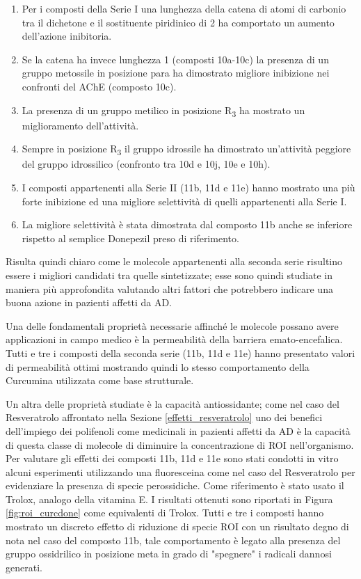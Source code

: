 \documentclass[a4paper, 12pt]{article}
\begin{document}
\begin{enumerate}
	\item Per i composti della Serie I una lunghezza della catena di atomi di carbonio tra il dichetone e il sostituente piridinico di 2 ha comportato un aumento dell'azione inibitoria.
	\item Se la catena ha invece lunghezza 1 (composti 10a-10c) la presenza di un gruppo metossile in posizione para ha dimostrato migliore inibizione nei confronti del AChE (composto 10c).
	\item La presenza di un gruppo metilico in posizione R\textsubscript{3} ha mostrato un miglioramento dell'attività.
	\item Sempre in posizione R\textsubscript{3} il gruppo idrossile ha dimostrato un'attività peggiore del gruppo idrossilico (confronto tra 10d e 10j, 10e e 10h).
	\item I composti appartenenti alla Serie II (11b, 11d e 11e) hanno mostrato una più forte inibizione ed una migliore selettività di quelli appartenenti alla Serie I.
	\item La migliore selettività è stata dimostrata dal composto 11b anche se inferiore rispetto al semplice Donepezil preso di riferimento.
\end{enumerate}

Risulta quindi chiaro come le molecole appartenenti alla seconda serie risultino essere i migliori candidati tra quelle sintetizzate; esse sono quindi studiate in maniera più approfondita valutando altri fattori che potrebbero indicare una buona azione in pazienti affetti da AD.

Una delle fondamentali proprietà necessarie affinché le molecole possano avere applicazioni in campo medico è la permeabilità della barriera emato-encefalica. Tutti e tre i composti della seconda serie (11b, 11d e 11e) hanno presentato valori di permeabilità ottimi mostrando quindi lo stesso comportamento della Curcumina utilizzata come base strutturale.

Un altra delle proprietà studiate è la capacità antiossidante; come nel caso del Resveratrolo affrontato nella Sezione \ref{effetti_resveratrolo} uno dei benefici dell'impiego dei polifenoli come medicinali in pazienti affetti da AD è la capacità di questa classe di molecole di diminuire la concentrazione di ROI nell'organismo. Per valutare gli effetti dei composti 11b, 11d e 11e sono stati condotti in vitro alcuni esperimenti utilizzando una fluoresceina come nel caso del Resveratrolo per evidenziare la presenza di specie perossidiche. Come riferimento è stato usato il Trolox, analogo della vitamina E. I risultati ottenuti sono riportati in Figura \ref{fig:roi_curcdone} come equivalenti di Trolox. Tutti e tre i composti hanno mostrato un discreto effetto di riduzione di specie ROI con un risultato degno di nota nel caso del composto 11b, tale comportamento è legato alla presenza del gruppo ossidrilico in posizione meta in grado di "spegnere" i radicali dannosi generati.
\end{document}
